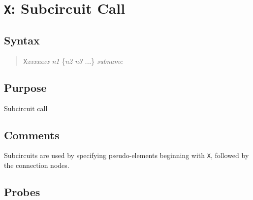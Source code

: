 %
%
%
%
\section{{\tt X}: Subcircuit Call}
\subsection{Syntax}
\begin{verse}
{\tt X}{\it xxxxxxx n1} \{{\it n2 n3 ...}\} {\it subname}
\end{verse}
\subsection{Purpose}

Subcircuit call
\subsection{Comments}

Subcircuits are used by specifying pseudo-elements beginning with {\tt X},
followed by the connection nodes.
\subsection{Probes}

